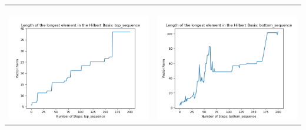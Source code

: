 \documentclass[10pt]{article}
\begin{document}
\begin{tabular}{c|c}
\begin{minipage}{.45\textwidth}
\end{minipage} \\ \\
\hline \\
\begin{minipage}{.45\textwidth}
\includegraphics[width=\textwidth]{"DATA/5d/5 generators 2 bound I alternating/top_sequence LENGTH"}
\end{minipage} &
\begin{minipage}{.45\textwidth}
\includegraphics[width=\textwidth]{"DATA/5d/5 generators 2 bound I alternating/bottom_sequence LENGTH"}
\end{minipage}
\end{tabular}
\end{document}
